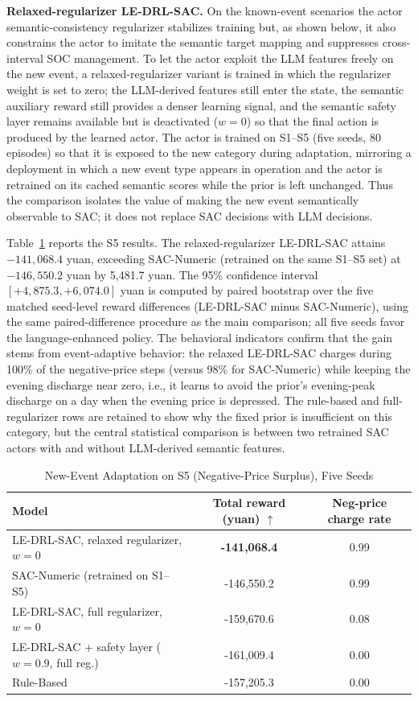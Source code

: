 \documentclass{ieeeaccess}
\begin{document}
\textbf{Relaxed-regularizer LE-DRL-SAC.} On the known-event scenarios the actor semantic-consistency regularizer stabilizes training but, as shown below, it also constrains the actor to imitate the semantic target mapping and suppresses cross-interval SOC management. To let the actor exploit the LLM features freely on the new event, a relaxed-regularizer variant is trained in which the regularizer weight is set to zero; the LLM-derived features still enter the state, the semantic auxiliary reward still provides a denser learning signal, and the semantic safety layer remains available but is deactivated ($w=0$) so that the final action is produced by the learned actor. The actor is trained on S1--S5 (five seeds, 80 episodes) so that it is exposed to the new category during adaptation, mirroring a deployment in which a new event type appears in operation and the actor is retrained on its cached semantic scores while the prior is left unchanged. Thus the comparison isolates the value of making the new event semantically observable to SAC; it does not replace SAC decisions with LLM decisions.

Table~\ref{tab:s5_unseen} reports the S5 results. The relaxed-regularizer LE-DRL-SAC attains $-141{,}068.4$ yuan, exceeding SAC-Numeric (retrained on the same S1--S5 set) at $-146{,}550.2$ yuan by 5{,}481.7 yuan. The 95\% confidence interval $[+4{,}875.3, +6{,}074.0]$ yuan is computed by paired bootstrap over the five matched seed-level reward differences (LE-DRL-SAC minus SAC-Numeric), using the same paired-difference procedure as the main comparison; all five seeds favor the language-enhanced policy. The behavioral indicators confirm that the gain stems from event-adaptive behavior: the relaxed LE-DRL-SAC charges during 100\% of the negative-price steps (versus 98\% for SAC-Numeric) while keeping the evening discharge near zero, i.e., it learns to avoid the prior's evening-peak discharge on a day when the evening price is depressed. The rule-based and full-regularizer rows are retained to show why the fixed prior is insufficient on this category, but the central statistical comparison is between two retrained SAC actors with and without LLM-derived semantic features.

\begin{table}[t!]
\caption{New-Event Adaptation on S5 (Negative-Price Surplus), Five Seeds}
\label{tab:s5_unseen}
\centering
\begin{tabular}{lcc}
\toprule
\textbf{Model} & \textbf{Total reward (yuan)} $\uparrow$ & \textbf{Neg-price charge rate} \\
\midrule
LE-DRL-SAC, relaxed regularizer, $w=0$ & \textbf{-141,068.4} & 0.99 \\
SAC-Numeric (retrained on S1--S5) & -146,550.2 & 0.99 \\
LE-DRL-SAC, full regularizer, $w=0$ & -159,670.6 & 0.08 \\
LE-DRL-SAC + safety layer ($w=0.9$, full reg.) & -161,009.4 & 0.00 \\
Rule-Based & -157,205.3 & 0.00 \\
\bottomrule
\end{tabular}
\end{table}
\end{document}
